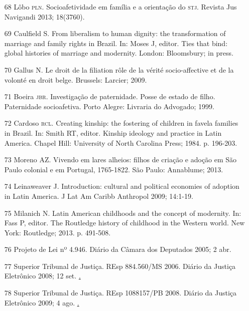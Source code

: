 \documentclass{article}
\begin{document}
\begin{itemize}
\item[68] Lôbo \textsc{pln}. Socioafetividade em família e a orientação do \textsc{stj}.
Revista Jus Navigandi 2013; 18(3760).

\item[69] Caulfield S. From liberalism to human dignity: the transformation
of marriage and family rights in Brazil. In: Moses J, editor. Ties that bind:
global histories of marriage and modernity. London: Bloomsbury; in press.

\item[70] Gallus N. Le droit de la filiation rôle de la vérité
socio-affective et de la volonté en droit belge. Brussels: Larcier; 2009.

\item[71] Boeira \textsc{jbr}. Investigação de paternidade. Posse de estado de filho.
Paternidade socioafetiva. Porto Alegre: Livraria do Advogado; 1999.

\item[72] Cardoso \textsc{rcl}. Creating kinship: the fostering of children in favela
families in Brazil. In: Smith RT, editor. Kinship ideology and practice in Latin
America. Chapel Hill: University of North Carolina Press; 1984. p. 196-203.

\item[73] Moreno AZ. Vivendo em lares alheios: filhos de criação e adoção em
São Paulo colonial e em Portugal, 1765-1822. São Paulo: Annablume; 2013.

\item[74] Leinaweaver J. Introduction: cultural and political economies of
adoption in Latin America. J Lat Am Caribb Anthropol 2009; 14:1-19.

\item[75] Milanich N. Latin American childhoods and the concept of
modernity. In: Fass P, editor. The Routledge history of childhood in the Western
world. New York: Routledge; 2013. p. 491-508.

\item[76] Projeto de Lei nº 4.946. Diário da Câmara dos Deputados 2005; 2
abr.

\item[77] Superior Tribunal de Justiça. REsp 884.560/MS 2006. Diário da
Justiça Eletrônico 2008; 12 set. \href{https://ww2.stj.jus.br/processo/revista/d
ocumento/mediado/?componente=\textsc{mon}\&sequencial=4205009\&num\_{}registro=2006019356
91\&data=20080912}.

\item[78] Superior Tribunal de Justiça. REsp 1088157/PB 2008. Diário da
Justiça Eletrônico 2009; 4 ago. \href{https://ww2.stj.jus.br/processo/revista/do
cumento/mediado/?componente=\textsc{ita}\&sequencial=896969\&num\_{}registro=200801995643
\&data=20090804\&formato=\textsc{pdf}}.


\end{itemize}
\end{document}
